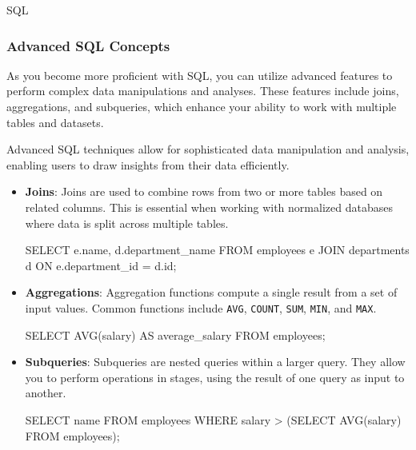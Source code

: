 \begin{notes}{SQL}
\begin{highlight}
    \end{highlight}
    
    \subsubsection*{Advanced SQL Concepts}
    
    As you become more proficient with SQL, you can utilize advanced features to perform complex data manipulations and analyses. These features include joins, aggregations, and subqueries, which enhance your ability to work with multiple tables and datasets.
    
    \begin{highlight}
    
        Advanced SQL techniques allow for sophisticated data manipulation and analysis, enabling users to draw insights from their data efficiently.
        
        \begin{itemize}
            \item \textbf{Joins}: Joins are used to combine rows from two or more tables based on related columns. This is essential when working with normalized databases where data is split across multiple tables.
    \begin{code}[SQL]
    SELECT e.name, d.department_name
    FROM employees e
    JOIN departments d ON e.department_id = d.id;
    \end{code}
            \item \textbf{Aggregations}: Aggregation functions compute a single result from a set of input values. Common functions include \texttt{AVG}, \texttt{COUNT}, \texttt{SUM}, \texttt{MIN}, and \texttt{MAX}.
    \begin{code}[SQL]
    SELECT AVG(salary) AS average_salary
    FROM employees;
    \end{code}
            \item \textbf{Subqueries}: Subqueries are nested queries within a larger query. They allow you to perform operations in stages, using the result of one query as input to another.
    \begin{code}[SQL]
    SELECT name
    FROM employees
    WHERE salary > (SELECT AVG(salary) FROM employees);
    \end{code}
        \end{itemize}
    
    \end{highlight}
    

\end{notes}
